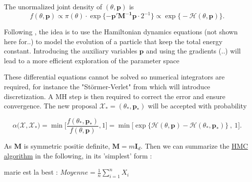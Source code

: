 \documentclass[11pt,a4paper,openany ]{book}
\begin{document}
The unormalized joint density of $(\theta,\boldsymbol{p})$ is 
\begin{equation}
f(\theta,\boldsymbol{p})\propto \pi(\theta)\cdot\exp\{-\boldsymbol{p'M^{-1}p}\cdot 2^{-1}\}\propto\exp\big\{-\mathcal{H}(\theta,\boldsymbol{p})\big\}.
\end{equation}


Following \cite{hartmann_bayesian_2016}, the idea is to use the Hamiltonian dynamics equations (not shown here for..) to model the evolution of a particle that keep the total energy constant.
Introducing the auxiliary variables $\boldsymbol{p}$ and using the gradients (..) will lead to a more efficient exploration of the parameter space 



These differential equations cannot be solved so numerical integrators are required, for instance the "Störmer-Verlet" from \cite{leimkulher_..._2004} which will introduce discretization. A MH step is then required to correct the error and ensure convergence.  The new proposal $\mathcal{X}_*=(\theta_*,\boldsymbol{p}_*)$ will be accepted with probability 

\begin{equation}
\alpha\big(\mathcal{X},\mathcal{X}_*\big)=\min\Bigg[\frac{f(\theta_*,\boldsymbol{p}_*)}{f(\theta,\boldsymbol{p})},1\Bigg]=\min\Big[\exp\big\{\mathcal{H}(\theta,\boldsymbol{p})-\mathcal{H}(\theta_*,\boldsymbol{p}_*)\big\}\ ,\ 1\Big].
\end{equation}

As $\boldsymbol{M}$ is symmetric positie definite, $\boldsymbol{M}=m\boldsymbol{I}_d$. 
Then we can summarize the \hyperref[algo_hmc]{HMC algorithm} in the following, in its 'simplest' form :

marie est la best : $Moyenne=\frac{1}{n}\sum_{i=1}^{n}X_i$
\end{document}
